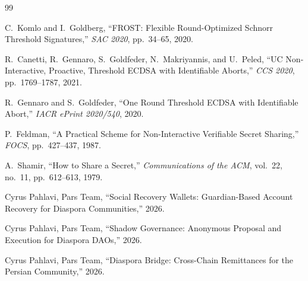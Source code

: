 \documentclass[11pt,a4paper]{article}
\begin{document}
\begin{thebibliography}{99}

C.~Komlo and I.~Goldberg,
``FROST: Flexible Round-Optimized Schnorr Threshold Signatures,''
\emph{SAC 2020}, pp.~34--65, 2020.

R.~Canetti, R.~Gennaro, S.~Goldfeder, N.~Makriyannis, and U.~Peled,
``UC Non-Interactive, Proactive, Threshold ECDSA with Identifiable
Aborts,''
\emph{CCS 2020}, pp.~1769--1787, 2021.

R.~Gennaro and S.~Goldfeder,
``One Round Threshold ECDSA with Identifiable Abort,''
\emph{IACR ePrint 2020/540}, 2020.

P.~Feldman,
``A Practical Scheme for Non-Interactive Verifiable Secret Sharing,''
\emph{FOCS}, pp.~427--437, 1987.

A.~Shamir,
``How to Share a Secret,''
\emph{Communications of the ACM}, vol.~22, no.~11, pp.~612--613, 1979.

Cyrus Pahlavi, Pars Team,
``Social Recovery Wallets: Guardian-Based Account Recovery for Diaspora
Communities,''
2026.

Cyrus Pahlavi, Pars Team,
``Shadow Governance: Anonymous Proposal and Execution for Diaspora DAOs,''
2026.

Cyrus Pahlavi, Pars Team,
``Diaspora Bridge: Cross-Chain Remittances for the Persian Community,''
2026.

\end{thebibliography}
\end{document}
